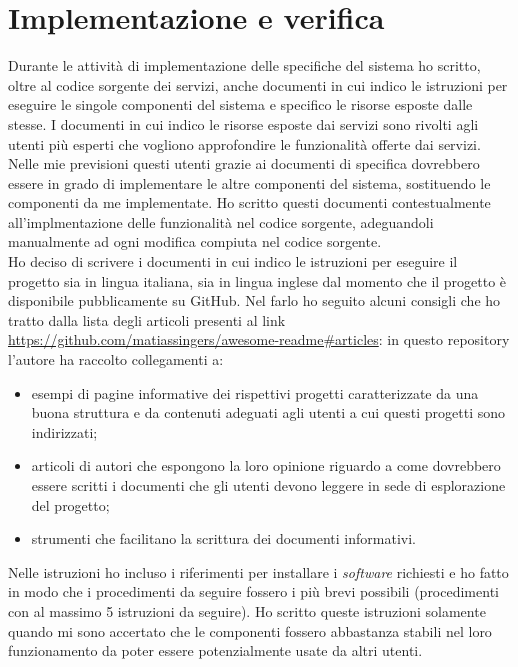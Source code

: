 \pagebreak

\section{Implementazione e verifica}

Durante le attività di implementazione delle specifiche del sistema ho scritto, oltre al codice sorgente dei servizi, anche documenti in cui indico le istruzioni per eseguire le singole componenti del sistema e specifico le risorse esposte dalle stesse.
I documenti in cui indico le risorse esposte dai servizi sono rivolti agli utenti più esperti che vogliono approfondire le funzionalità offerte dai servizi. Nelle mie previsioni questi utenti grazie ai documenti di specifica dovrebbero essere in grado di implementare le altre componenti del sistema, sostituendo le componenti da me implementate. Ho scritto questi documenti contestualmente all'implmentazione delle funzionalità nel codice sorgente, adeguandoli manualmente ad ogni modifica compiuta nel codice sorgente.\\
Ho deciso di scrivere i documenti in cui indico le istruzioni per eseguire il progetto sia in lingua italiana, sia in lingua inglese dal momento che il progetto è disponibile pubblicamente su GitHub. Nel farlo ho seguito alcuni consigli che ho tratto dalla lista degli articoli presenti al link \url{https://github.com/matiassingers/awesome-readme\#articles}: in questo \gls{repository} l'autore ha raccolto collegamenti a:
\begin{itemize}
  \item esempi di pagine informative dei rispettivi progetti caratterizzate da una buona struttura e da contenuti adeguati agli utenti a cui questi progetti sono indirizzati;
  \item articoli di autori che espongono la loro opinione riguardo a come dovrebbero essere scritti i documenti che gli utenti devono leggere in sede di esplorazione del progetto;
  \item strumenti che facilitano la scrittura dei documenti informativi.
\end{itemize}
Nelle istruzioni ho incluso i riferimenti per installare i \emph{software} richiesti e ho fatto in modo che i procedimenti da seguire fossero i più brevi possibili (procedimenti con al massimo 5 istruzioni da seguire). Ho scritto queste istruzioni solamente quando mi sono accertato che le componenti fossero abbastanza stabili nel loro funzionamento da poter essere potenzialmente usate da altri utenti.\\
